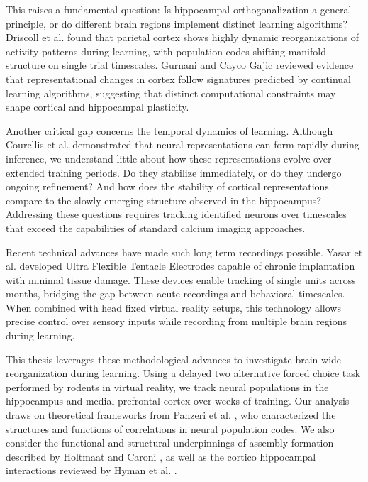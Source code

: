 This raises a fundamental question: Is hippocampal orthogonalization a general principle, or do different brain regions implement distinct learning algorithms? Driscoll et al. \cite{driscoll2017dynamic} found that parietal cortex shows highly dynamic reorganizations of activity patterns during learning, with population codes shifting manifold structure on single trial timescales. Gurnani and Cayco Gajic \cite{gurnani2023signatures} reviewed evidence that representational changes in cortex follow signatures predicted by continual learning algorithms, suggesting that distinct computational constraints may shape cortical and hippocampal plasticity.

Another critical gap concerns the temporal dynamics of learning. Although Courellis et al. \cite{courellis2024abstract} demonstrated that neural representations can form rapidly during inference, we understand little about how these representations evolve over extended training periods. Do they stabilize immediately, or do they undergo ongoing refinement? And how does the stability of cortical representations compare to the slowly emerging structure observed in the hippocampus? Addressing these questions requires tracking identified neurons over timescales that exceed the capabilities of standard calcium imaging approaches.

Recent technical advances have made such long term recordings possible. Yasar et al. \cite{yasar2024months} developed Ultra Flexible Tentacle Electrodes capable of chronic implantation with minimal tissue damage. These devices enable tracking of single units across months, bridging the gap between acute recordings and behavioral timescales. When combined with head fixed virtual reality setups, this technology allows precise control over sensory inputs while recording from multiple brain regions during learning.

This thesis leverages these methodological advances to investigate brain wide reorganization during learning. Using a delayed two alternative forced choice task performed by rodents in virtual reality, we track neural populations in the hippocampus and medial prefrontal cortex over weeks of training. Our analysis draws on theoretical frameworks from Panzeri et al. \cite{panzeri2022structures}, who characterized the structures and functions of correlations in neural population codes. We also consider the functional and structural underpinnings of assembly formation described by Holtmaat and Caroni \cite{holtmaat2016functional}, as well as the cortico hippocampal interactions reviewed by Hyman et al. \cite{hyman2010working}.

